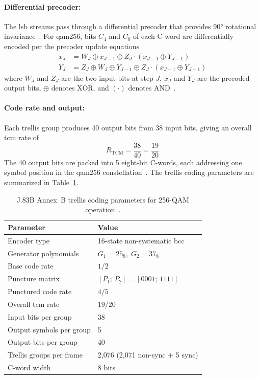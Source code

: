 \paragraph{Differential precoder:}
The \ac{lsb} streams pass through a differential precoder that
provides 90° rotational invariance~\cite{ITU_J83}.
For \ac{qam256}, bits $C_4$ and $C_0$ of each C-word are
differentially encoded per the precoder update
equations~\cite{ITU_J83}
\begin{align}
  x_J &= W_J \oplus x_{J-1} \oplus Z_J \cdot
         (x_{J-1} \oplus Y_{J-1})
  \label{eq:precode_x} \\
  Y_J &= Z_J \oplus W_J \oplus Y_{J-1} \oplus Z_J \cdot
         (x_{J-1} \oplus Y_{J-1})
  \label{eq:precode_y}
\end{align}
\noindent where $W_J$ and $Z_J$ are the two input bits at step
$J$, $x_J$ and $Y_J$ are the precoded output bits, $\oplus$
denotes XOR, and $(\cdot)$ denotes AND~\cite{ITU_J83}.

\paragraph{Code rate and output:}
Each trellis group produces 40 output bits from 38 input bits,
giving an overall \ac{tcm} rate of~\cite{ITU_J83}
\begin{equation}
  R_\text{TCM} = \frac{38}{40} = \frac{19}{20}
  \label{eq:trellis_rate}
\end{equation}
\noindent The 40 output bits are packed into 5 eight-bit C-words,
each addressing one symbol position in the \ac{qam256}
constellation~\cite{ITU_J83}.
The trellis coding parameters are summarized in
Table~\ref{tab:trellis_params}.

\begin{table}[htbp]
  \caption{J.83B Annex~B trellis coding parameters for
           256-QAM operation~\cite{ITU_J83}.}
  \label{tab:trellis_params}
  \centering
  \begin{tabular}{ll}
    \hline
    Parameter                & Value \\
    \hline
    Encoder type             & 16-state non-systematic \ac{bcc} \\
    Generator polynomials    & $G_1 = 25_8,\; G_2 = 37_8$ \\
    Base code rate           & $1/2$ \\
    Puncture matrix          & $[P_1;\,P_2] = [0001;\,1111]$ \\
    Punctured code rate      & $4/5$ \\
    Overall \ac{tcm} rate   & $19/20$ \\
    Input bits per group     & 38 \\
    Output symbols per group & 5 \\
    Output bits per group    & 40 \\
    Trellis groups per frame & 2{,}076 (2{,}071 non-sync $+$ 5 sync) \\
    C-word width             & 8 bits \\
    \hline
  \end{tabular}
\end{table}

